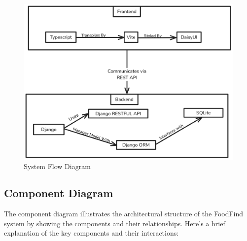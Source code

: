 \documentclass[12pt, a4paper, oneside]{article}
\begin{document}
\begin{figure}[H]
    \centering
    \includegraphics[width=\textwidth,height=\textheight,keepaspectratio]{system flow}
    \caption{System Flow Diagram}
    \label{fig:system fLow}
\end{figure}
\pagebreak


\subsection{Component Diagram}

The component diagram illustrates the architectural structure of the FoodFind system by showing the components and their relationships. Here's a brief explanation of the key components and their interactions:
\end{document}
